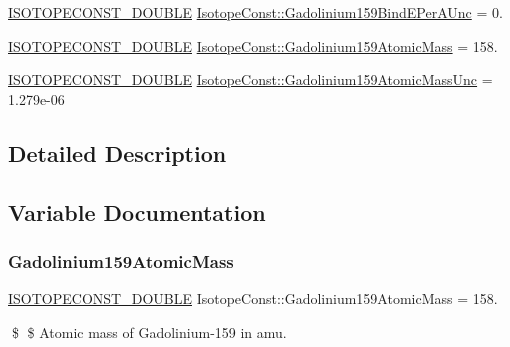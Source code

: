 \begin{DoxyCompactItemize}
\item 
\mbox{\hyperlink{group___isotope_const-_macros_ga8f45a7272ce02c0b4c65c44636ed719a}{I\+S\+O\+T\+O\+P\+E\+C\+O\+N\+S\+T\+\_\+\+D\+O\+U\+B\+LE}} \mbox{\hyperlink{group___isotope_const-_gadolinium-_gd159_ga420acc24cc1536eea6f994cbfffc22f7}{Isotope\+Const\+::\+Gadolinium159\+Bind\+E\+Per\+A\+Unc}} = 0.
\item 
\mbox{\hyperlink{group___isotope_const-_macros_ga8f45a7272ce02c0b4c65c44636ed719a}{I\+S\+O\+T\+O\+P\+E\+C\+O\+N\+S\+T\+\_\+\+D\+O\+U\+B\+LE}} \mbox{\hyperlink{group___isotope_const-_gadolinium-_gd159_ga8e964dba765f617b9463378b564c5ef3}{Isotope\+Const\+::\+Gadolinium159\+Atomic\+Mass}} = 158.
\item 
\mbox{\hyperlink{group___isotope_const-_macros_ga8f45a7272ce02c0b4c65c44636ed719a}{I\+S\+O\+T\+O\+P\+E\+C\+O\+N\+S\+T\+\_\+\+D\+O\+U\+B\+LE}} \mbox{\hyperlink{group___isotope_const-_gadolinium-_gd159_ga0192434a55c58f33941c481c39d48e8c}{Isotope\+Const\+::\+Gadolinium159\+Atomic\+Mass\+Unc}} = 1.\+279e-\/06
\end{DoxyCompactItemize}


\subsection{Detailed Description}


\subsection{Variable Documentation}
\mbox{\label{group___isotope_const-_gadolinium-_gd159_ga8e964dba765f617b9463378b564c5ef3}} 
\subsubsection{\texorpdfstring{Gadolinium159\+Atomic\+Mass}{Gadolinium159AtomicMass}}
{\footnotesize\ttfamily \mbox{\hyperlink{group___isotope_const-_macros_ga8f45a7272ce02c0b4c65c44636ed719a}{I\+S\+O\+T\+O\+P\+E\+C\+O\+N\+S\+T\+\_\+\+D\+O\+U\+B\+LE}} Isotope\+Const\+::\+Gadolinium159\+Atomic\+Mass = 158.}

\$ \$ Atomic mass of Gadolinium-\/159 in amu. \mbox{\label{group___isotope_const-_gadolinium-_gd159_ga0192434a55c58f33941c481c39d48e8c}} 
